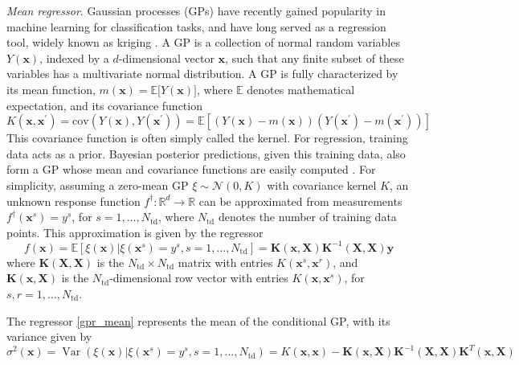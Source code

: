 \documentclass[preprint,10pt]{elsarticle}
\def\E{\mathbb{E}}
\def\cN{\mathcal{N}}
\begin{document}
\emph{Mean regressor}. Gaussian processes (GPs) have recently gained popularity in machine learning for classification tasks, and have long served as a 
regression tool, widely known as kriging \cite{cressie1990origins}. A GP is a collection of normal random variables $Y(\mathbf{x})$, indexed by a $d$-dimensional vector $\mathbf{x}$, 
such that any finite subset of these variables has a multivariate normal distribution. A GP is fully characterized by its mean function, $m(\mathbf{x}) = \E{[}Y(\mathbf{x}){]}$, 
where $\E$ denotes mathematical expectation, and its covariance function
\begin{equation}
K\left(\mathbf{x},\mathbf{x}^{\prime}\right) = \text{cov}\left(Y(\mathbf{x}), Y\left(\mathbf{x}^{\prime}\right)\right) = \mathbb{E}\left[(Y(\mathbf{x}) - m(\mathbf{x}))
	\left(Y\left(\mathbf{x}^{\prime}\right) - m\left(\mathbf{x}^{\prime}\right)\right)\right]
\label{eq_kernel}
\end{equation}
This covariance function is often simply called the kernel. For regression, training data acts as a prior. Bayesian posterior predictions, given this training data, also form a 
GP whose mean and covariance functions are easily computed \cite{rasmussen2003gaussian}. For simplicity, assuming a zero-mean GP $\xi\sim \cN(0, K)$ with covariance kernel $K$, an 
unknown response function $f^\dagger: \mathbb{R}^d \rightarrow \mathbb{R}$ can be approximated from measurements $f^\dagger(\mathbf{x}^s) = y^s$, for 
$s=1, \ldots, N_\text{td}$, where $N_\text{td}$ denotes the number of training data points. This approximation is given by the regressor
\begin{equation}
	\label{gpr_mean} 
	f(\mathbf{x})=\E\left[\xi(\mathbf{x})\big|\xi(\mathbf{x}^s)=y^s, s=1, \ldots, N_\text{td}\right]= \mathbf{K}(\mathbf{x}, \mathbf{X}) \mathbf{K}^{-1}(\mathbf{X}, \mathbf{X})
	\mathbf{y}
\end{equation}
where $\mathbf{K}(\mathbf{X}, \mathbf{X})$ is the $N_{\text{td}}\times N_{\text{td}}$ matrix with entries $K(\mathbf{x}^s, \mathbf{x}^r)$, and $\mathbf{K}(\mathbf{x},\mathbf{X})$
is the $N_{\text{td}}$-dimensional row vector with entries $K\left(\mathbf{x},\mathbf{x}^s\right)$, for $s, r = 1, \ldots, N_{\text{td}}$.

The regressor \eqref{gpr_mean} represents the mean of the conditional GP, with its variance given by
\begin{equation}
\label{gpr_var}
\sigma^2(\mathbf{x})=\operatorname{Var}\left(\xi(\mathbf{x})\big| \xi(\mathbf{x}^s)=y^s, s=1,\ldots,N_\text{td}\right) = K(\mathbf{x},\mathbf{x})-\mathbf{K}(\mathbf{x}, \mathbf{X})\mathbf{K}^{-1}(\mathbf{X},\mathbf{X})\mathbf{K}^T(\mathbf{x},\mathbf{X})
\end{equation}
\end{document}
